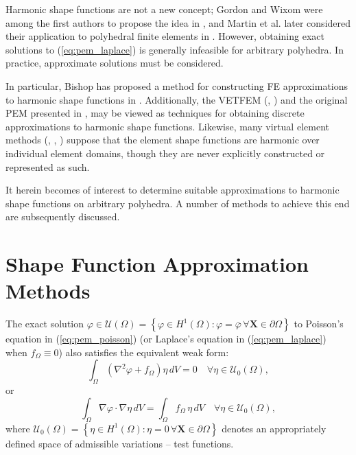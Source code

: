 	Harmonic shape functions are not a new concept; Gordon and Wixom were among the first authors to propose the idea in \cite{Gordon:74}, and Martin et al. later considered their application to polyhedral finite elements in \cite{Martin:08}. However, obtaining exact solutions to (\ref{eq:pem_laplace}) is generally infeasible for arbitrary polyhedra. In practice, approximate solutions must be considered.
	
	In particular, Bishop has proposed a method for constructing FE approximations to harmonic shape functions in \cite{Bishop:14}. Additionally, the VETFEM (\cite{Rashid:00}, \cite{Rashid:06}) and the original PEM presented in \cite{Rashid:12}, may be viewed as techniques for obtaining discrete approximations to harmonic shape functions. Likewise, many virtual element methods (\cite{Chi:17}, \cite{Veiga:13}, \cite{Veiga:15}) suppose that the element shape functions are harmonic over individual element domains, though they are never explicitly constructed or represented as such.
	
	It herein becomes of interest to determine suitable approximations to harmonic shape functions on arbitrary polyhedra. A number of methods to achieve this end are subsequently discussed.
	
\section{Shape Function Approximation Methods} \label{sec:approximations}
	
	The exact solution $\varphi \in \mathcal{U} (\Omega) = \left\{ \varphi \in H^1(\Omega) : \varphi = \bar{\varphi} \, \forall \mathbf{X} \in \partial \Omega \right\}$ to Poisson's equation in (\ref{eq:pem_poisson}) (or Laplace's equation in (\ref{eq:pem_laplace}) when $f_\Omega \equiv 0$) also satisfies the equivalent weak form:
	\begin{equation}
		\int_\Omega (\nabla^2 \varphi + f_{\Omega}) \eta \, dV = 0 \quad \forall \eta \in \mathcal{U}_0 (\Omega),
	\end{equation}
	or
	\begin{equation}
		\int_\Omega \nabla \varphi \cdot \nabla \eta \, dV = \int_\Omega f_{\Omega} \, \eta \, dV \quad \forall \eta \in \mathcal{U}_0 (\Omega),
		\label{eq:weak_bvp}
	\end{equation}
	where $\mathcal{U}_0 (\Omega) = \left\{ \eta \in H^1(\Omega) : \eta = 0 \, \forall \mathbf{X} \in \partial \Omega \right\}$ denotes an appropriately defined space of admissible variations -- test functions.
	
